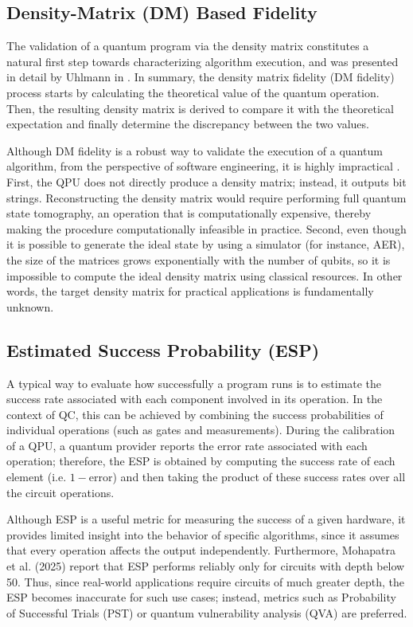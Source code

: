 \documentclass[10pt,conference]{IEEEtran}
\begin{document}
\subsection{Density-Matrix (DM) Based Fidelity}
\label{sec:density-matrix}

The validation of a quantum program via the density matrix constitutes a natural first step towards characterizing algorithm execution, and was presented in detail by Uhlmann in \cite{UHLMANN1976273_1976}. In summary, the density matrix fidelity (DM fidelity) process starts by calculating the theoretical value of the quantum operation. Then, the resulting density matrix is derived to compare it with the theoretical expectation and finally determine the discrepancy between the two values.

Although DM fidelity is a robust way to validate the execution of a quantum algorithm, from the perspective of software engineering, it is highly impractical \cite{LI20146878_2014}. First, the QPU does not directly produce a density matrix; instead, it outputs bit strings. Reconstructing the density matrix would require performing full quantum state tomography, an operation that is computationally expensive, thereby making the procedure computationally infeasible in practice. Second, even though it is possible to generate the ideal state by using a simulator (for instance, AER), the size of the matrices grows exponentially with the number of qubits, so it is impossible to compute the ideal density matrix using classical resources. In other words, the target density matrix for practical applications is fundamentally unknown.

\subsection{Estimated Success Probability (ESP)}

A typical way to evaluate how successfully a program runs is to estimate the success rate associated with each component involved in its operation. In the context of QC, this can be achieved by combining the success probabilities of individual operations (such as gates and measurements). During the calibration of a QPU, a quantum provider reports the error rate associated with each operation; therefore, the ESP is obtained by computing the success rate of each element (i.e. \(1 - \text{error}\)) and then taking the product of these success rates over all the circuit operations.

Although ESP is a useful metric for measuring the success of a given hardware, it provides limited insight into the behavior of specific algorithms, since it assumes that every operation affects the output independently. Furthermore, Mohapatra et al. (2025) report that ESP performs reliably only for circuits with depth below 50. Thus, since real-world applications require circuits of much greater depth, the ESP becomes inaccurate for such use cases; instead, metrics such as Probability of Successful Trials (PST) or quantum vulnerability analysis (QVA) \cite{qiQuantumVulnerabilityAnalysis_2024} are preferred.
\end{document}
